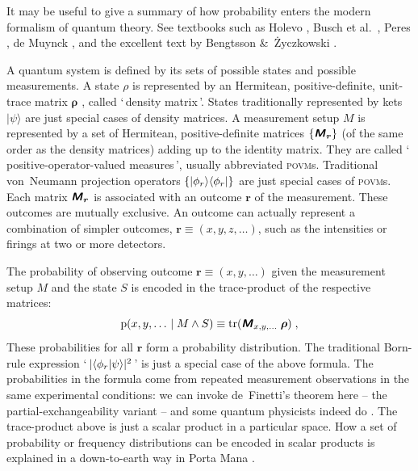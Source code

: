 \documentclass[\ifafour a4paper,12pt,\else a5paper,10pt,\fi%
onecolumn,oneside,article,%
british%
]{memoir}
\newcommand*{\defquote}[1]{`\,#1\,'}
\theoremstyle{remark}
\theoremstyle{innote}
\newcommand*{\mathte}[1]{\textbf{\textit{\textsf{#1}}}}
\newcommand*{\citep}{\parencites}%
\newcommand*{\citey}{\parencites*}
\newcommand*{\amp}{\&}
\DeclareMathOperator{\tr}{tr}%
\DeclarePairedDelimiter\abs{\lvert}{\rvert}
\DeclarePairedDelimiter\set{\{}{\}}
\newcommand*{\pf}{\mathrm{p}}%
\renewcommand*{\|}[1][]{\nonscript\,#1\vert\nonscript\;\mathopen{}}
\newcommand*{\chap}{ch.}%
\newcommand*{\etal}{{et al.}}
\newcommand*{\yr}{\bm{\rho}}
\newcommand*{\yM}{\mathte{M}}
\newcommand*{\povm}{\textsc{povm}}
\newcommand*{\ybr}{\bm{r}}
\begin{document}
It may be useful to give a summary of how probability enters the modern
formalism of quantum theory. See textbooks such as Holevo
\citey{holevo1980_t2011}, Busch \etal\ \citey{buschetal1995b}, Peres
\citey[especially \chap~12]{peres1995}, de Muynck \citey[especially
\chap~3]{demuynck2002b}, and the excellent text by Bengtsson \amp\
\.Zyczkowski \citey{bengtssonetal2006_r2017}.

A quantum system is defined by its sets of possible states and possible
measurements. A state $\rho$ is represented by an Hermitean,
positive-definite, unit-trace matrix $\yr$ \citep[which satisfies
additional mathematical
properties:][]{jakobczyketal2001,kimura2003,kimuraetal2004,bengtssonetal2006_r2017},
called \defquote{density matrix}. States traditionally represented by kets
$\lvert \psi \rangle$ are just special cases of density matrices. A
measurement setup $M$ is represented by a set of Hermitean,
positive-definite matrices $\set{\yM_{\ybr}}$ (of the same order as the
density matrices) adding up to the identity matrix. They are called
\defquote{positive-operator-valued measures}, usually abbreviated \povm s.
Traditional von~Neumann projection operators
$\set{\lvert \phi_{r} \rangle\langle \phi_{r}\rvert}$ are just special
cases of \povm s. Each matrix $\yM_{\ybr}$ is associated with an outcome
$\ybr$ of the measurement. These outcomes are mutually exclusive. An
outcome can actually represent a combination of simpler outcomes,
$\ybr\equiv(x,y,z,\dotsc)$, such as the intensities or firings at two or
more detectors.

The probability of observing outcome $\ybr\equiv (x, y, \dotsc)$ given
the measurement setup $M$ and the state $S$ is encoded in the trace-product
of the respective matrices:
\begin{equation}
  \label{eq:povm_trace}
  \pf(x,y,\dotsc \| M \land S) \equiv \tr(\yM_{x,y,\dotsc}\;\yr) \;,
\end{equation}
These probabilities for all $\ybr$ form a probability distribution. The
traditional Born-rule expression
\defquote{$\abs{\langle \phi_{r} \vert \psi \rangle}^{2}$} is just a
special case of the above formula. The probabilities in the formula come
from repeated measurement observations in the same experimental conditions:
we can invoke de~Finetti's \citey{definetti1937,definetti1938} theorem here
-- the partial-exchangeability variant -- and some quantum physicists
indeed do \citep{cavesetal2002,vanenketal2002,fuchsetal2004b}. The
trace-product above is just a scalar product in a particular space. How a
set of probability or frequency distributions can be encoded in scalar
products is explained in a down-to-earth way in Porta Mana
\citey{portamana2003b,portamana2004b}.
\end{document}

